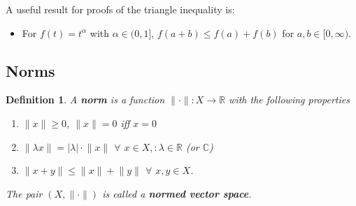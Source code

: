\documentclass[two column]{article}
\newtheorem{definition}{Definition}[subsection]
\begin{document}
A useful result for proofs of the triangle inequality is:
\begin{itemize}
\item For $f(t) = t^{\alpha}$ with $\alpha \in (0,1]$, $f(a+b) \leq f(a) + f(b)$ for $a,b \in [0, \infty)$.
\end{itemize}

\subsection{Norms} \label{norms}

\begin{definition}  \label{norms}
A {\bf norm} is a function $\lVert \cdot \rVert : X \rightarrow \mathbb{R}$ with the following properties
\begin{enumerate}
\item $\lVert x \rVert \geq 0$, $\lVert x \rVert = 0$ iff $x=0$
\item $\lVert \lambda x \rVert = \lvert \lambda \rvert \cdot \lVert x \rVert$ $\forall$ $x \in X, : \lambda \in \mathbb{R}$ (or $\mathbb{C}$) 
\item $\lVert x + y \rVert \leq \lVert x \rVert + \lVert y \rVert$ $\forall$ $x,y \in X$.
\end{enumerate}
The pair $(X, \lVert \cdot \rVert)$ is called a {\bf normed vector space}. 
\end{definition}
\end{document}
